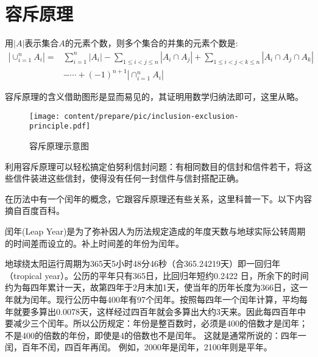 
\section{容斥原理}
\label{sec:inclusion-exclusion-principle}

\begin{principle}[容斥原理]
  用$|A|$表示集合$A$的元素个数，则多个集合的并集的元素个数是:
  \begin{equation}
    \label{eq:inclusion-exclusion-principle}
    \begin{split}
    |\cup_{i=1}^nA_i|= & \sum_{i=1}^n|A_i|-\sum_{1\leqslant i <j \leqslant n}|A_i \cap A_j|+\sum_{1 \leqslant i <j <k \leqslant n}|A_i\cap A_j \cap A_k| \\
 & -\cdots+(-1)^{n+1}|\cap_{i=1}^nA_i|
    \end{split}
  \end{equation}
\end{principle}
容斥原理的含义借助图形是显而易见的，其证明用数学归纳法即可，这里从略。

\begin{figure}[htbp]
  \centering
\texttt{[image: content/prepare/pic/inclusion-exclusion-principle.pdf]}
\caption{容斥原理示意图}
\label{fig:inclusion-exclusion-principle}
\end{figure}


利用容斥原理可以轻松搞定伯努利信封问题：有相同数目的信封和信件若干，将这些信件装进这些信封，使得没有任何一封信件与信封搭配正确。

在历法中有一个闰年的概念，它跟容斥原理还有些关系，这里科普一下。以下内容摘自百度百科。

闰年(Leap Year)是为了弥补因人为历法规定造成的年度天数与地球实际公转周期的时间差而设立的。补上时间差的年份为闰年。

地球绕太阳运行周期为365天5小时48分46秒（合365.24219天）即一回归年（tropical year）。公历的平年只有365日，比回归年短约0.2422 日，所余下的时间约为每四年累计一天，故第四年于2月末加1天，使当年的历年长度为366日，这一年就为闰年。现行公历中每400年有97个闰年。按照每四年一个闰年计算，平均每年就要多算出0.0078天，这样经过四百年就会多算出大约3天来。因此每四百年中要减少三个闰年。所以公历规定：年份是整百数时，必须是400的倍数才是闰年；不是400的倍数的年份，即使是4的倍数也不是闰年。
这就是通常所说的：四年一闰，百年不闰，四百年再闰。 例如，2000年是闰年，2100年则是平年。

